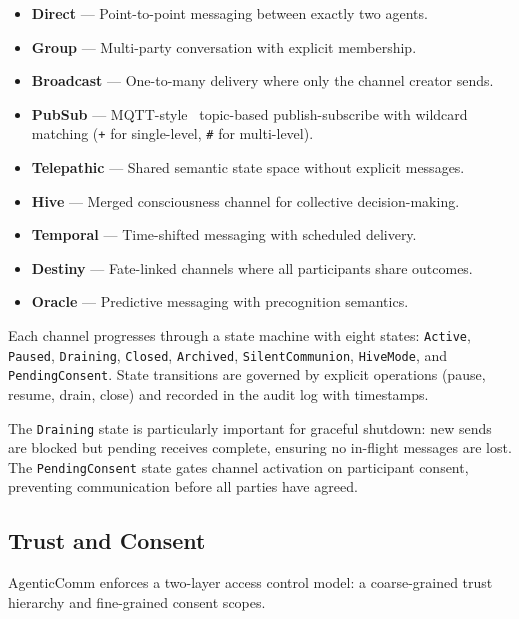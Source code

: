 \documentclass[10pt, twocolumn]{article}
\begin{document}
\begin{itemize}[nosep, leftmargin=*]
  \item \textbf{Direct} --- Point-to-point messaging between exactly two agents.
  \item \textbf{Group} --- Multi-party conversation with explicit membership.
  \item \textbf{Broadcast} --- One-to-many delivery where only the channel creator sends.
  \item \textbf{PubSub} --- MQTT-style~\cite{mqtt2019} topic-based publish-subscribe with wildcard matching (\texttt{+} for single-level, \texttt{\#} for multi-level).
  \item \textbf{Telepathic} --- Shared semantic state space without explicit messages.
  \item \textbf{Hive} --- Merged consciousness channel for collective decision-making.
  \item \textbf{Temporal} --- Time-shifted messaging with scheduled delivery.
  \item \textbf{Destiny} --- Fate-linked channels where all participants share outcomes.
  \item \textbf{Oracle} --- Predictive messaging with precognition semantics.
\end{itemize}

Each channel progresses through a state machine with eight states: \texttt{Active}, \texttt{Paused}, \texttt{Draining}, \texttt{Closed}, \texttt{Archived}, \texttt{SilentCommunion}, \texttt{HiveMode}, and \texttt{PendingConsent}. State transitions are governed by explicit operations (pause, resume, drain, close) and recorded in the audit log with timestamps.

The \texttt{Draining} state is particularly important for graceful shutdown: new sends are blocked but pending receives complete, ensuring no in-flight messages are lost. The \texttt{PendingConsent} state gates channel activation on participant consent, preventing communication before all parties have agreed.


\subsection{Trust and Consent}
\label{sec:trust}

AgenticComm enforces a two-layer access control model: a coarse-grained trust hierarchy and fine-grained consent scopes.
\end{document}
